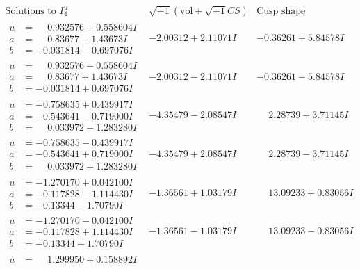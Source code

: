 \documentclass[1p]{elsarticle_modified}
\theoremstyle{definition}
\newcommand{\I}{\sqrt{-1}}
\begin{document}
$$\begin{array}{c|c|c}  
\text{Solutions to }I^u_{4}& \I (\text{vol} + \sqrt{-1}CS) & \text{Cusp shape}\\
 \hline 
\begin{aligned}
u &= \phantom{-}0.932576 + 0.558604 I \\
a &= \phantom{-}0.83677 - 1.43673 I \\
b &= -0.031814 - 0.697076 I\end{aligned}
 & -2.00312 + 2.11071 I & -0.36261 + 5.84578 I \\ \hline\begin{aligned}
u &= \phantom{-}0.932576 - 0.558604 I \\
a &= \phantom{-}0.83677 + 1.43673 I \\
b &= -0.031814 + 0.697076 I\end{aligned}
 & -2.00312 - 2.11071 I & -0.36261 - 5.84578 I \\ \hline\begin{aligned}
u &= -0.758635 + 0.439917 I \\
a &= -0.543641 - 0.719000 I \\
b &= \phantom{-}0.033972 - 1.283280 I\end{aligned}
 & -4.35479 - 2.08547 I & \phantom{-}2.28739 + 3.71145 I \\ \hline\begin{aligned}
u &= -0.758635 - 0.439917 I \\
a &= -0.543641 + 0.719000 I \\
b &= \phantom{-}0.033972 + 1.283280 I\end{aligned}
 & -4.35479 + 2.08547 I & \phantom{-}2.28739 - 3.71145 I \\ \hline\begin{aligned}
u &= -1.270170 + 0.042100 I \\
a &= -0.117828 - 1.114430 I \\
b &= -0.13344 - 1.70790 I\end{aligned}
 & -1.36561 + 1.03179 I & \phantom{-}13.09233 + 0.83056 I \\ \hline\begin{aligned}
u &= -1.270170 - 0.042100 I \\
a &= -0.117828 + 1.114430 I \\
b &= -0.13344 + 1.70790 I\end{aligned}
 & -1.36561 - 1.03179 I & \phantom{-}13.09233 - 0.83056 I \\ \hline\begin{aligned}
u &= \phantom{-}1.299950 + 0.158892 I \\

\end{aligned}
\end{array}$$
\end{document}
